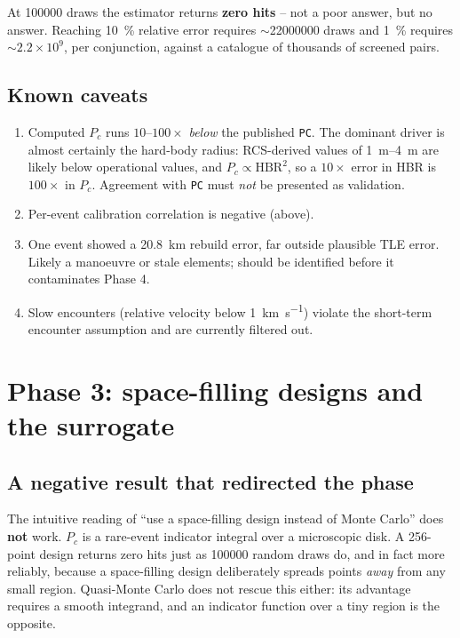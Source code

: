 \documentclass[11pt]{article}
\newcommand{\Pc}{P_c}
\begin{document}
At \num{100000} draws the estimator returns \textbf{zero hits} -- not a
poor answer, but no answer. Reaching \SI{10}{\percent} relative error
requires $\sim$\num{22000000} draws and \SI{1}{\percent} requires
$\sim2.2\times10^{9}$, per conjunction, against a catalogue of thousands
of screened pairs.

\subsection{Known caveats}\label{sec:caveats}

\begin{enumerate}
  \item Computed $\Pc$ runs $10$--$100\times$ \emph{below} the published
        \texttt{PC}. The dominant driver is almost certainly the hard-body
        radius: RCS-derived values of \SIrange{1}{4}{\meter} are likely
        below operational values, and $\Pc \propto \text{HBR}^2$, so a
        $10\times$ error in HBR is $100\times$ in $\Pc$. Agreement with
        \texttt{PC} must \emph{not} be presented as validation.
  \item Per-event calibration correlation is negative (above).
  \item One event showed a \SI{20.8}{\kilo\meter} rebuild error, far
        outside plausible TLE error. Likely a manoeuvre or stale elements;
        should be identified before it contaminates Phase 4.
  \item Slow encounters (relative velocity below
        \SI{1}{\kilo\meter\per\second}) violate the short-term encounter
        assumption and are currently filtered out.
\end{enumerate}

\section{Phase 3: space-filling designs and the surrogate}\label{sec:phase3}

\subsection{A negative result that redirected the phase}\label{sec:negative}

The intuitive reading of ``use a space-filling design instead of Monte
Carlo'' does \textbf{not} work. $\Pc$ is a rare-event indicator integral
over a microscopic disk. A 256-point design returns zero hits just as
\num{100000} random draws do, and in fact more reliably, because a
space-filling design deliberately spreads points \emph{away} from any
small region. Quasi-Monte Carlo does not rescue this either: its
advantage requires a smooth integrand, and an indicator function over a
tiny region is the opposite.
\end{document}
